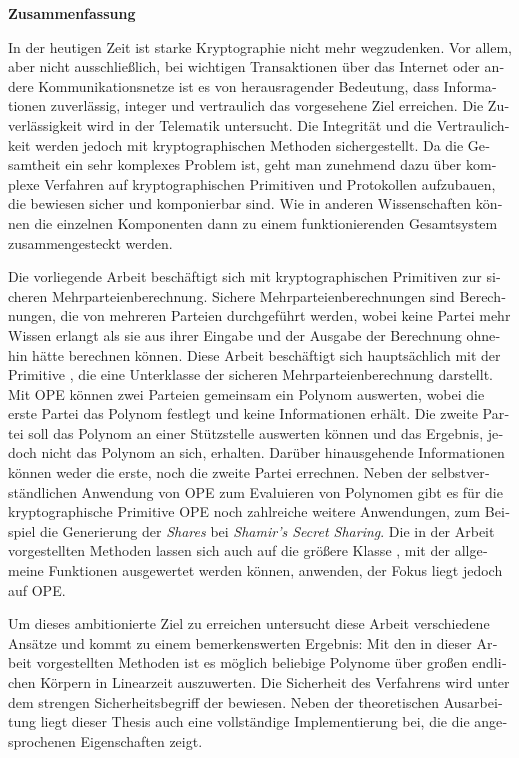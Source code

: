 \cleardoublepage

\noindent{}\textsf{\textbf{\huge Zusammenfassung}}

\bigskip{}
\begin{otherlanguage}{ngerman}

\noindent{}In der heutigen Zeit ist starke Kryptographie nicht mehr wegzudenken.
Vor allem, aber nicht ausschließlich, bei wichtigen Transaktionen über das
Internet oder andere Kommunikationsnetze ist es von herausragender Bedeutung,
dass Informationen zuverlässig, integer und vertraulich das vorgesehene Ziel
erreichen. Die Zuverlässigkeit wird in der Telematik untersucht. Die Integrität
und die Vertraulichkeit werden jedoch mit kryptographischen Methoden
sichergestellt. Da die Gesamtheit ein sehr komplexes Problem ist, geht man
zunehmend dazu über komplexe Verfahren auf kryptographischen Primitiven und
Protokollen aufzubauen, die bewiesen sicher und komponierbar sind. Wie in
anderen Wissenschaften können die einzelnen Komponenten dann zu einem
funktionierenden Gesamtsystem zusammengesteckt werden.

Die vorliegende Arbeit beschäftigt sich mit kryptographischen Primitiven zur
sicheren Mehrparteienberechnung. Sichere Mehrparteienberechnungen sind
Berechnungen, die von mehreren Parteien durchgeführt werden, wobei keine Partei
mehr Wissen erlangt als sie aus ihrer Eingabe und der Ausgabe der Berechnung
ohnehin hätte berechnen können. Diese Arbeit beschäftigt sich hauptsächlich mit
der Primitive , die eine
Unterklasse der sicheren Mehrparteienberechnung darstellt. Mit OPE können zwei
Parteien gemeinsam ein Polynom auswerten, wobei die erste Partei das Polynom
festlegt und keine Informationen erhält. Die zweite Partei soll das Polynom an
einer Stützstelle auswerten können und das Ergebnis, jedoch nicht das Polynom an
sich, erhalten. Darüber hinausgehende Informationen können weder die erste, noch
die zweite Partei errechnen. Neben der selbstverständlichen Anwendung von OPE
zum Evaluieren von Polynomen gibt es für die kryptographische Primitive OPE noch
zahlreiche weitere Anwendungen, zum Beispiel die Generierung der \emph{Shares}
bei \emph{Shamir's Secret Sharing}. Die in der Arbeit vorgestellten Methoden
lassen sich auch auf die größere Klasse , mit der allgemeine Funktionen ausgewertet werden können,
anwenden, der Fokus liegt jedoch auf OPE.

Um dieses ambitionierte Ziel zu erreichen untersucht diese Arbeit verschiedene
Ansätze und kommt zu einem bemerkenswerten Ergebnis: Mit den in dieser Arbeit
vorgestellten Methoden ist es möglich beliebige Polynome über großen endlichen
Körpern in Linearzeit auszuwerten. Die Sicherheit des Verfahrens wird unter dem
strengen Sicherheitsbegriff der  bewiesen.
Neben der theoretischen Ausarbeitung liegt dieser Thesis auch eine vollständige
Implementierung bei, die die angesprochenen Eigenschaften zeigt.

\end{otherlanguage}

\cleardoublepage

